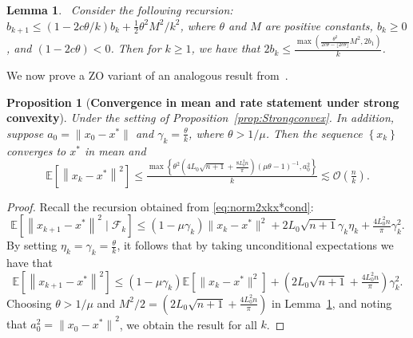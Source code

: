 \documentclass[11pt,reqno]{amsart}
\newcommand{\1}{{\bf 1}}
\newcommand{\2}{{\bf 2}}
\numberwithin{equation}{section}
\newtheorem{lemma}{Lemma}[section]
\newtheorem{proposition}{Proposition}[section]
\theoremstyle{remark}
\begin{document}
{		\begin{lemma}~\cite{shapiro2014lectures}\label{Lemma:ak}
			Consider the following recursion: \( {b}_{k+1} \leq(1-2 c \theta / k) {b}_{k}+\frac{1}{2} \theta^{2} M^{2} / k^{2} \), where \( \theta \) and \( M \) are positive constants, \( {b}_{k} \geq 0 \), and \( (1-2 c \theta)<0 \). Then for \( k \geq 1 \), we have that
			$2 {b}_{k} \leq \frac{\max \left(\frac{\theta^{2}}{2 c \theta-\lfloor 2 c \theta\rfloor} M^{2}, 2 {b}_{1}\right)}{k}$.
		\end{lemma}
		We now prove a ZO variant of an analogous result from~\cite{shapiro2014lectures}.
		\begin{proposition}[{\bf Convergence in mean and rate statement under strong convexity}]  
			Under the setting of Proposition~\ref{prop:Strongconvex}. In addition, suppose $a_0 = {\|x_0-x^{*}\|} $ and \( \gamma_{k}=\tfrac{\theta}{k} \), where \( \theta>1 /  \mu \). Then the sequence \( \left\{x_{k}\right\} \) converges to \( x^{*} \) in mean and
			\begin{equation*}
				\mathbb{E}\left[\left\|x_{k}-x^{*}\right\|^{2}\right] \leq \tfrac{\max \left\{\theta^{2} {(4L_0\sqrt{n+1}+ \frac{8L_0^2n}{ \pi})}(\mu \theta-1)^{-1}, {a_0^2} \right\}}{k}{\lesssim \mathcal{O}\left(\tfrac{n}{k}\right)}.
			\end{equation*}
		\end{proposition}
		\begin{proof}
		Recall the recursion obtained from \eqref{eq:norm2xkx*cond}:
		\begin{equation*}
			\mathbb{E}\left[\left\|x_{k+1}-x^{*}\right\|^{2} \mid \mathcal{F}_{k}\right] \leq (1-\mu\gamma_k)\|x_k-x^*\|^2+2L_0\sqrt{n+1}\gamma_k\eta_k+ \tfrac{4L_0^2n}{ \pi}\gamma_k^2.
		\end{equation*}
		By setting $\eta_k=\gamma_k=\frac{\theta}{k}$, it follows that by taking unconditional expectations we have that
		\begin{equation*}
			\mathbb{E}\left[\left\|x_{k+1}-x^{*}\right\|^{2}\right] \leq (1-\mu\gamma_k)\mathbb{E}\left[\|x_k-x^*\|^2\right]+(2L_0\sqrt{n+1}+ \tfrac{4L_0^2n}{ \pi})\gamma_k^2.
		\end{equation*}	
		Choosing \( \theta>1 /  \mu \) and \( M^{2} / 2=(2L_0\sqrt{n+1}+ \frac{4L_0^2n}{ \pi}) \) in Lemma~\ref{Lemma:ak}, {and noting that $a_0^2 = {\|x_0-x^{*}\|}^2 $}, we obtain the result for all \( k \).
		\end{proof}
		
}
\end{document}
